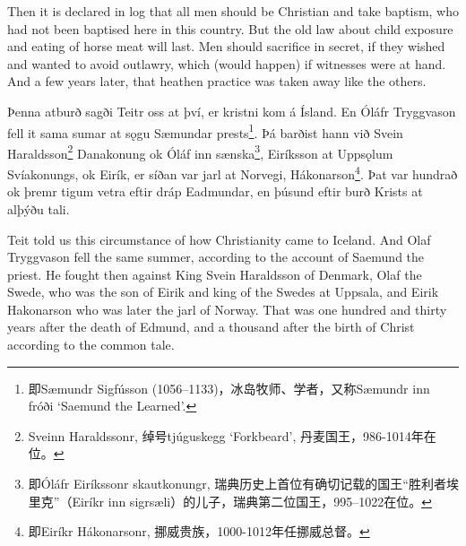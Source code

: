 \begin{paracol}{2}
    Then it is declared in log that all men should be Christian and take baptism, who had not been baptised here in this country. But the old law about child exposure and eating of horse meat will last. Men should sacrifice in secret, if they wished and wanted to avoid outlawry, which (would happen) if witnesses were at hand. And a few years later, that heathen practice was taken away like the others.
    \switchcolumn*

    Þenna atburð sagði Teitr oss at því, er kristni kom á Ísland. En Óláfr Tryggvason fell it sama sumar at sǫgu Sæmundar prests\footnote{即Sæmundr Sigfússon (1056–1133)，冰岛牧师、学者，又称Sæmundr inn fróði `Saemund the Learned'.}. Þá barðist hann við Svein Haraldsson\footnote{Sveinn Haraldssonr, 绰号tjúguskegg `Forkbeard', 丹麦国王，986-1014年在位。} Danakonung ok Óláf inn sænska\footnote{即Óláfr Eiríkssonr skautkonungr, 瑞典历史上首位有确切记载的国王“胜利者埃里克”（Eiríkr inn sigrsæli）的儿子，瑞典第二位国王，995–1022在位。}, Eiríksson at Uppsǫlum Svíakonungs, ok Eirík, er síðan var jarl at Norvegi, Hákonarson\footnote{即Eiríkr Hákonarsonr, 挪威贵族，1000-1012年任挪威总督。}. Þat var hundrað ok þremr tigum vetra eftir dráp Eadmundar, en þúsund eftir burð Krists at alþýðu tali.
    \switchcolumn

    Teit told us this circumstance of how Christianity came to Iceland. And Olaf Tryggvason fell the same summer, according to the account of Saemund the priest. He fought then against King Svein Haraldsson of Denmark, Olaf the Swede, who was the son of Eirik and king of the Swedes at Uppsala, and Eirik Hakonarson who was later the jarl of Norway. That was one hundred and thirty years after the death of Edmund, and a thousand after the birth of Christ according to the common tale.
\end{paracol}


